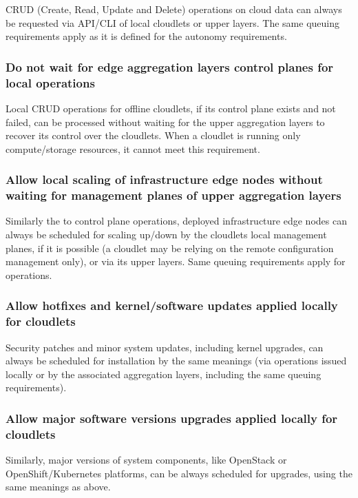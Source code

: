 \documentclass[conference]{IEEEtran}
\begin{document}
CRUD (Create, Read, Update and Delete) operations on cloud data can always be
requested via API/CLI of local cloudlets or upper layers. The same queuing
requirements apply as it is defined for the autonomy requirements.

\subsubsection{Do not wait for edge aggregation layers control planes for local
operations}

Local CRUD operations for offline cloudlets, if its control plane exists and
not failed, can be processed without waiting for the upper aggregation layers
to recover its control over the cloudlets. When a cloudlet is running only
compute/storage resources, it cannot meet this requirement.

\subsubsection{Allow local scaling of infrastructure edge nodes without waiting
for management planes of upper aggregation layers}

Similarly the to control plane operations, deployed infrastructure edge nodes
can always be scheduled for scaling up/down by the cloudlets local management
planes, if it is possible (a cloudlet may be relying on the remote
configuration management only), or via its upper layers. Same queuing
requirements apply for operations.

\subsubsection{Allow hotfixes and kernel/software updates applied locally for
cloudlets}

Security patches and minor system updates, including kernel upgrades, can
always be scheduled for installation by the same meanings (via operations
issued locally or by the associated aggregation layers, including the same
queuing requirements).

\subsubsection{Allow major software versions upgrades applied locally for
cloudlets}

Similarly, major versions of system components, like OpenStack or
OpenShift/Kubernetes platforms, can be always scheduled for upgrades, using the
same meanings as above.
\end{document}
